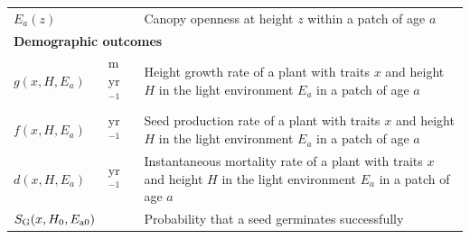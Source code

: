\documentclass[10pt,twoside]{article}
\begin{document}
\begin{table}[h!]
\begin{tabular}{p{2cm}p{2.5cm}p{8cm}}
$E_{a}(z)$&& Canopy openness at height $z$ within a patch of age $a$\\
\multicolumn{3}{l}{\textbf{Demographic outcomes}} \\
$g(x, H, E_{a})$ & m yr$^{-1}$ & Height growth rate of a plant with traits $x$ and height $H$ in the light environment $E_a$ in a patch of age $a$ \\
$f(x, H, E_{a})$ & yr$^{-1}$ & Seed production rate of a plant with traits $x$ and height $H$ in the light environment $E_a$ in a patch of age $a$\\
$d(x, H, E_{a})$ & yr$^{-1}$ & Instantaneous mortality rate of a plant with traits $x$ and height $H$ in the light environment $E_a$ in a patch of age $a$\\
$S_{\rm G} (x, H_0, E_{{\rm a}0})$ & & Probability that a seed germinates successfully \\
\hline
\end{tabular}
\label{tab:definitions}
\end{table}

\newpage
\end{document}
